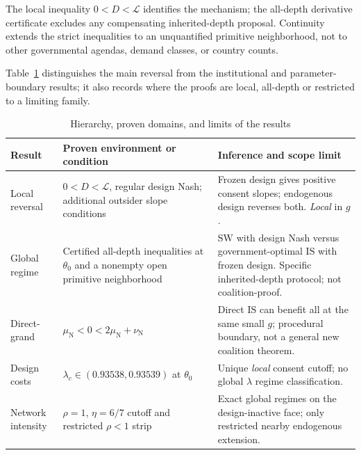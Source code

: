 \documentclass[11pt,a4paper]{article}
\theoremstyle{remark}\newtheorem{remark}[theorem]{Remark}
\newcommand{\SW}{\mathrm{SW}}\newcommand{\SU}{\mathrm{SU}}\newcommand{\IS}{\mathrm{IS}}
\newcommand{\N}{\mathrm{N}}\newcommand{\F}{\mathrm{F}}
\newcommand{\loss}{\mathcal L}\newcommand{\vect}[1]{\boldsymbol{#1}}
\begin{document}
The local inequality $0<D<\loss$ identifies the mechanism; the all-depth derivative certificate excludes any compensating inherited-depth proposal. Continuity extends the strict inequalities to an unquantified primitive neighborhood, not to other governmental agendas, demand classes, or country counts.

Table~\ref{tab:map} distinguishes the main reversal from the institutional and parameter-boundary results; it also records where the proofs are local, all-depth or restricted to a limiting family.


\begin{table}[tbp]
\centering\footnotesize
\caption{Hierarchy, proven domains, and limits of the results}\label{tab:map}
\renewcommand{\arraystretch}{1.22}
\begin{tabularx}{\linewidth}{@{}>{\raggedright\arraybackslash}p{.18\linewidth}>{\raggedright\arraybackslash}p{.34\linewidth}>{\raggedright\arraybackslash}X@{}}
\toprule
Result & Proven environment or condition & Inference and scope limit \\
\midrule
Local reversal & $0<D<\mathcal L$, regular design Nash; additional outsider slope conditions & Frozen design gives positive consent slopes; endogenous design reverses both. \emph{Local} in $g$. \\
Global regime & Certified all-depth inequalities at $\theta_0$ and a nonempty open primitive neighborhood & $\SW$ with design Nash versus government-optimal $\IS$ with frozen design. Specific inherited-depth protocol; not coalition-proof. \\
Direct-grand & $\mu_{\N}<0<2\mu_{\N}+\nu_{\N}$ & Direct $\IS$ can benefit all at the same small $g$; procedural boundary, not a general new coalition theorem. \\
Design costs & $\lambda_c\in(0.93538,0.93539)$ at $\theta_0$ & Unique \emph{local} consent cutoff; no global $\lambda$ regime classification. \\
Network intensity & $\rho=1$, $\eta=6/7$ cutoff and restricted $\rho<1$ strip & Exact global regimes on the design-inactive face; only restricted nearby endogenous extension. \\
\bottomrule
\end{tabularx}
\end{table}
\end{document}
